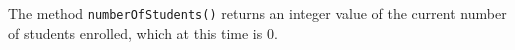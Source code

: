 The method \verb|numberOfStudents()| returns an integer value of the
current number of students enrolled, which at this time is 0.
